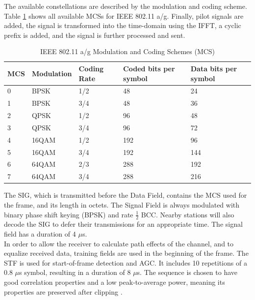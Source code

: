 The available constellations are described by the modulation and coding scheme. Table \ref{tbl:mcs} shows all available \glspl{MCS} for \gls{IEEE} 802.11 a/g. Finally, pilot signals are added, the signal is transformed into the time-domain using the \gls{IFFT}, a cyclic prefix is added, and the signal is further processed and sent.

\begin{table}[ht]
	\centering
	\begin{tabular}{|p{2.5cm}|p{2.5cm}|p{2.5cm}|p{2.5cm}|p{2.5cm}|}
		\hline
		\textbf{MCS} & \textbf{Modulation} & \textbf{Coding Rate} & \textbf{Coded bits per symbol} & \textbf{Data bits per symbol} \\ \hline
		0 & BPSK & 1/2 & 48 & 24 \\ \hline
		1 & BPSK & 3/4 & 48 & 36 \\ \hline
		2 & QPSK & 1/2 & 96 & 48 \\ \hline
		3 & QPSK & 3/4 & 96 & 72 \\ \hline
		4 & 16QAM & 1/2 & 192 & 96 \\ \hline
		5 & 16QAM & 3/4 & 192 & 144 \\ \hline
		6 & 64QAM & 2/3 & 288 & 192 \\ \hline
		7 & 64QAM & 3/4 & 288 & 216 \\ \hline
	\end{tabular}
	\caption[\gls{IEEE} 802.11 a/g Modulation and Coding Schemes]{\gls{IEEE} 802.11 a/g Modulation and Coding Schemes (MCS) \cite{ieee2012} \label{tbl:mcs}}
\end{table}

The \gls{SIG}, which is transmitted before the Data Field, contains the \gls{MCS} used for the frame, and its length in octets. The Signal Field is always modulated with binary phase shift keying (BPSK) and rate $\frac{1}{2}$ \gls{BCC}. Nearby stations will also decode the \gls{SIG} to defer their transmissions for an appropriate time. The signal field has a duration of 4 $\mu$s.\\

In order to allow the receiver to calculate path effects of the channel, and to equalize received data, training fields are used in the beginning of the frame. The \gls{STF} is used for start-of-frame detection and \gls{AGC}. It includes 10 repetitions of a 0.8 $\mu$s symbol, resulting in a duration of 8 $\mu$s. The sequence is chosen to have good correlation properties and a low peak-to-average power, meaning its properties are preserved after clipping \cite{perahia2013}.

